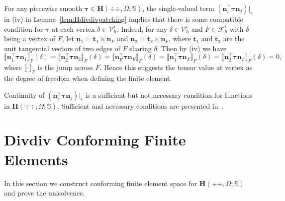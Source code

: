 For any piecewise smooth $\boldsymbol \tau\in \boldsymbol{H}(\div{\div },\Omega; \mathbb{S})$,    
the single-valued term $(\boldsymbol  n_i^{\intercal}\boldsymbol \tau\boldsymbol  n_j)|_e$ in (iv) in Lemma~\ref{lem:Hdivdivpatching} implies that there is some compatible condition for $\boldsymbol \tau$ at each vertex $\delta\in\mathcal V_h^i$.
Indeed, for any $\delta\in\mathcal V_h^i$ and $F\in\mathcal F_h^i$ with $\delta$ being a vertex of $F$, let $\boldsymbol n_1=\boldsymbol t_1\times\boldsymbol n_F$ and $\boldsymbol n_2=\boldsymbol t_2\times\boldsymbol n_F$, where $\boldsymbol t_1$ and $\boldsymbol t_2$ are the unit tangential vectors of two edges of $F$ sharing $\delta$. Then by (iv) we have
\[
\llbracket\boldsymbol  n_1^{\intercal}\boldsymbol \tau\boldsymbol  n_1\rrbracket_F(\delta)=\llbracket\boldsymbol  n_2^{\intercal}\boldsymbol \tau\boldsymbol  n_2\rrbracket_F(\delta)=\llbracket\boldsymbol  n_F^{\intercal}\boldsymbol \tau\boldsymbol  n_F\rrbracket_F(\delta)=\llbracket\boldsymbol  n_1^{\intercal}\boldsymbol \tau\boldsymbol  n_F\rrbracket_F(\delta)=\llbracket\boldsymbol  n_2^{\intercal}\boldsymbol \tau\boldsymbol  n_F\rrbracket_F(\delta)=0,
\]
where $\llbracket\cdot\rrbracket_F$ is the jump across $F$.
Hence this suggests the tensor value at vertex as the degree of freedom when defining the finite element.


Continuity of $(\boldsymbol  n_i^{\intercal}\boldsymbol \tau\boldsymbol  n_j)|_e$ is a sufficient but not necessary condition for functions in $\boldsymbol{H}(\div{\div },\Omega; \mathbb{S})$. Sufficient and necessary conditions are presented in~\cite[Proposition 3.6]{Fuhrer;Heuer;Niemi:2019ultraweak}.

\section{Divdiv Conforming Finite Elements}\label{sec:fem}
In this section we construct conforming finite element space for $\boldsymbol{H}(\div{\div },\Omega; \mathbb{S})$ and prove the unisolvence.


